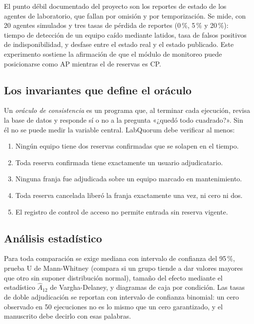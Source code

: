\documentclass[11pt,a4paper]{article}
\begin{document}
El punto débil documentado del proyecto son los reportes de estado de los agentes de laboratorio, que fallan por omisión y por temporización. Se mide, con 20 agentes simulados y tres tasas de pérdida de reportes (0\,\%, 5\,\% y 20\,\%): tiempo de detección de un equipo caído mediante latidos, tasa de falsos positivos de indisponibilidad, y desfase entre el estado real y el estado publicado. Este experimento sostiene la afirmación de que el módulo de monitoreo puede posicionarse como AP mientras el de reservas es CP.

\subsection{Los invariantes que define el oráculo}

Un \emph{oráculo de consistencia} es un programa que, al terminar cada ejecución, revisa la base de datos y responde sí o no a la pregunta «¿quedó todo cuadrado?». Sin él no se puede medir la variable central. LabQuorum debe verificar al menos:

\begin{enumerate}[leftmargin=*,itemsep=3pt]
	\item Ningún equipo tiene dos reservas confirmadas que se solapen en el tiempo.
	\item Toda reserva confirmada tiene exactamente un usuario adjudicatario.
	\item Ninguna franja fue adjudicada sobre un equipo marcado en mantenimiento.
	\item Toda reserva cancelada liberó la franja exactamente una vez, ni cero ni dos.
	\item El registro de control de acceso no permite entrada sin reserva vigente.
\end{enumerate}

\subsection{Análisis estadístico}

Para toda comparación se exige mediana con intervalo de confianza del 95\,\%, prueba U de Mann-Whitney (compara si un grupo tiende a dar valores mayores que otro sin suponer distribución normal), tamaño del efecto mediante el estadístico $\hat{A}_{12}$ de Vargha-Delaney, y diagramas de caja por condición. Las tasas de doble adjudicación se reportan con intervalo de confianza binomial: un cero observado en 50 ejecuciones no es lo mismo que un cero garantizado, y el manuscrito debe decirlo con esas palabras.
\end{document}
